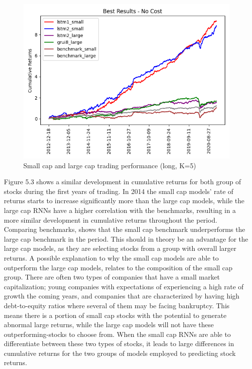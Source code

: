 \indent\newline 
\begin{figure}[H]
\centering
\includegraphics [scale=0.60,angle=360]{figures/cumulative_best_mix_cap_return_no_cost.png}
\caption{Small cap and large cap trading performance (long, K=5)}
\label{fig:mixtrading}
\end{figure}

\indent\newline 
Figure 5.3 shows a similar development in cumulative returns for both group of stocks during the first years of trading. In 2014 the small cap models' rate of returns starts to increase significantly more than the large cap models, while the large cap RNNs have a higher correlation with the benchmarks, resulting in a more similar development in cumulative returns throughout the period. Comparing benchmarks, shows that the small cap benchmark underperforms the large cap benchmark in the period. This should in theory be an advantage for the large cap models, as they are selecting stocks from a group with overall larger returns. A possible explanation to why the small cap models are able to outperform the large cap models, relates to the composition of the small cap group. There are often two types of companies that have a small market capitalization; young companies with expectations of experiencing a high rate of growth the coming years, and companies that are characterized by having high debt-to-equity ratios where several of them may be facing bankruptcy. This means there is a portion of small cap stocks with the potential to generate abnormal large returns, while the large cap models will not have these outperforming-stocks to choose from. When the small cap RNNs are able to differentiate between these two types of stocks, it leads to large differences in cumulative returns for the two groups of models employed to predicting stock returns. 

